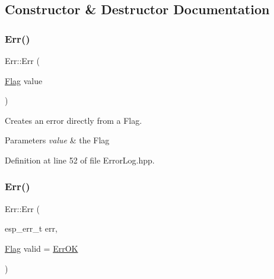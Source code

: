 \subsection{Constructor \& Destructor Documentation}
\mbox{\label{classErr_a24c3a115a0fe75d783de8a482ee41813}} 
\subsubsection{\texorpdfstring{Err()}{Err()}\hspace{0.1cm}{\footnotesize\ttfamily [1/2]}}
{\footnotesize\ttfamily Err\+::\+Err (\begin{DoxyParamCaption}\item[{\mbox{\hyperlink{classErr_a5027803a04dbda5395326274137d63ff}{Flag}}}]{value }\end{DoxyParamCaption})\hspace{0.3cm}{\ttfamily [inline]}}

Creates an error directly from a Flag.


\begin{DoxyParams}{Parameters}
{\em value} & the Flag \\
\hline
\end{DoxyParams}


Definition at line 52 of file Error\+Log.\+hpp.


\begin{DoxyCode}{0}

\end{DoxyCode}
\mbox{\label{classErr_a1c99df024167b504910fb3404e5496ee}} 
\subsubsection{\texorpdfstring{Err()}{Err()}\hspace{0.1cm}{\footnotesize\ttfamily [2/2]}}
{\footnotesize\ttfamily Err\+::\+Err (\begin{DoxyParamCaption}\item[{esp\+\_\+err\+\_\+t}]{err,  }\item[{\mbox{\hyperlink{classErr_a5027803a04dbda5395326274137d63ff}{Flag}}}]{valid = {\ttfamily \mbox{\hyperlink{classErr_a5027803a04dbda5395326274137d63ffa32bb3ca49d660fa0525cba5aeb786059}{Err\+OK}}} }\end{DoxyParamCaption})\hspace{0.3cm}{\ttfamily [inline]}}

